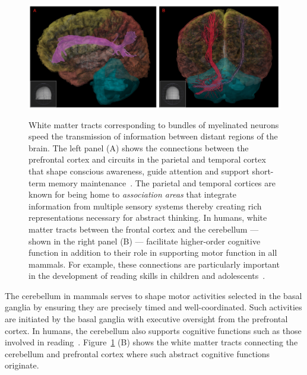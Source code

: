 \documentclass[letterpaper,11pt]{article}
\def\colorred#1{{\color{red}#1}}
\def\urlh#1{{}}
\def\emdash{---}
\begin{document}
\begin{figure}
%
  \begin{center} 
    \includegraphics[height=150pt]{./figures/White_Matter_Tracts_Long_Distance.jpg} %
  \end{center}
%
  \caption{White matter tracts corresponding to bundles of myelinated neurons speed the transmission of information between distant regions of the brain. The left panel ({\colorred{A}}) shows the connections between the prefrontal cortex and circuits in the parietal and temporal cortex that shape conscious awareness, guide attention and support short-term memory maintenance~\cite{ChicaetalBSF-18,Dehaene2014}. The parietal and temporal cortices are known for being home to {\it{association areas}} that integrate information from multiple sensory systems thereby creating rich representations necessary for abstract thinking. In humans, white matter tracts between the frontal cortex and the cerebellum {\emdash{}} shown in the right panel ({\colorred{B}}) {\emdash{}} facilitate higher-order cognitive function in addition to their role in supporting motor function in all mammals. For example, these connections are particularly important in the development of reading skills in children and adolescents~\cite{TravisetalHBM-15,KozioletalCEREBELLUM-14}.}
%    
  \label{fig_tracts}
%
\end{figure}


The cerebellum in mammals serves to shape motor activities selected in the basal ganglia by ensuring they are precisely timed and well-coordinated. Such activities are initiated by the basal ganglia with executive oversight from the prefrontal cortex. In humans, the cerebellum also supports cognitive functions such as those involved in reading~\cite{TravisetalHBM-15}. Figure~{\urlh{#fig_White_Matter_Tracts_Long_Distance}{\ref{fig_tracts}}} ({\colorred{B}}) shows the white matter tracts connecting the cerebellum and prefrontal cortex where such abstract cognitive functions originate. 
\end{document}
